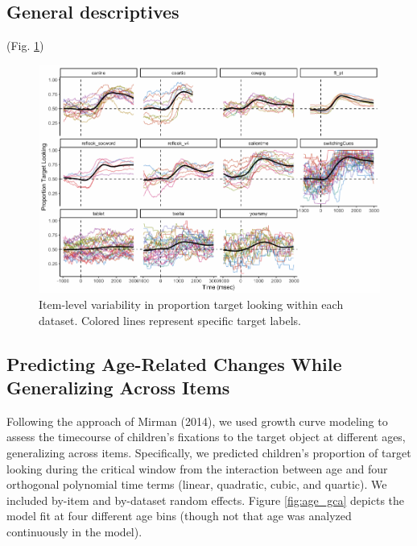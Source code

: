 \documentclass[10pt, letterpaper]{article}
\newenvironment{CodeChunk}{}{}
\begin{document}
\hypertarget{general-descriptives}{%
\subsection{General descriptives}\label{general-descriptives}}

(Fig. \ref{fig:peekbank_item_vis})

\begin{CodeChunk}
\begin{figure}[h]

{\centering \includegraphics{figs/peekbank_item_vis-1} 

}

\caption[Item-level variability in proportion target looking within each dataset]{Item-level variability in proportion target looking within each dataset. Colored lines represent specific target labels.}\label{fig:peekbank_item_vis}
\end{figure}
\end{CodeChunk}

\hypertarget{predicting-age-related-changes-while-generalizing-across-items}{%
\subsection{Predicting Age-Related Changes While Generalizing Across
Items}\label{predicting-age-related-changes-while-generalizing-across-items}}

Following the approach of Mirman (2014), we used growth curve modeling
to assess the timecourse of children's fixations to the target object at
different ages, generalizing across items. Specifically, we predicted
children's proportion of target looking during the critical window from
the interaction between age and four orthogonal polynomial time terms
(linear, quadratic, cubic, and quartic). We included by-item and
by-dataset random effects. Figure \ref{fig:age_gca} depicts the model
fit at four different age bins (though not that age was analyzed
continuously in the model).
\end{document}
